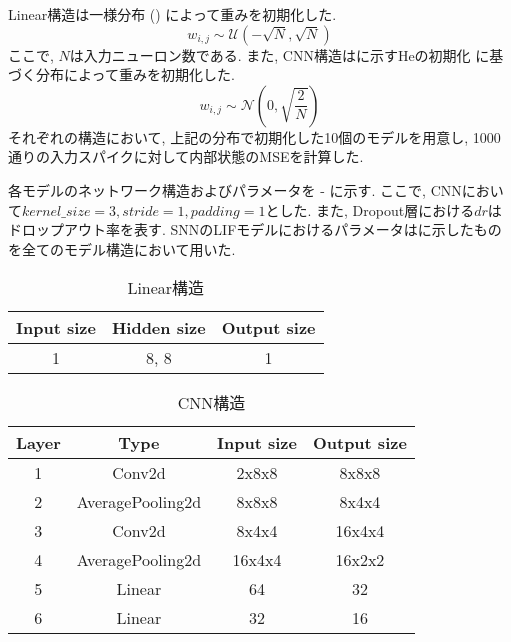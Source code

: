 Linear構造は一様分布 () によって重みを初期化した.
\begin{equation}
    w_{i,j} \sim \mathcal{U}\left(-\sqrt{N}, \sqrt{N}\right) \label{eq:uniform:distribution}
\end{equation}
ここで, $N$は入力ニューロン数である.
また, CNN構造はに示すHeの初期化\cite{heinit} に基づく分布によって重みを初期化した.
\begin{equation}
    w_{i,j} \sim \mathcal{N}\left(0, \sqrt{\frac{2}{N}}\right) \label{eq:he:initialization}
\end{equation}
それぞれの構造において, 上記の分布で初期化した10個のモデルを用意し, 1000通りの入力スパイクに対して内部状態のMSEを計算した.

各モデルのネットワーク構造およびパラメータを - に示す.
ここで, CNNにおいて$kernel\_size=3, stride=1, padding=1$とした.
また, Dropout層における$dr$はドロップアウト率を表す.
SNNのLIFモデルにおけるパラメータはに示したものを全てのモデル構造において用いた.
\begin{table}[htb]
    \centering
    \caption{Linear構造}
    \label{tab:model:parameter:linear}
    \begin{tabular}{ccc}
        \hline
        \textbf{Input size}& \textbf{Hidden size} & \textbf{Output size}\\
        \hline
        1   & 8, 8 & 1 \\
        \hline
    \end{tabular}
\end{table}

\begin{table}[htb]
    \centering
    \caption{CNN構造}
    \label{tab:model:parameter:cnn}
    \begin{tabular}{cccc}
        \hline
        \textbf{Layer}& \textbf{Type}&\textbf{Input size} & \textbf{Output size}\\
        \hline
        1   & Conv2d & 2x8x8 & 8x8x8 \\
        2 & AveragePooling2d & 8x8x8 & 8x4x4 \\
        3 & Conv2d & 8x4x4 & 16x4x4 \\
        4 & AveragePooling2d & 16x4x4 & 16x2x2 \\
        5 & Linear & 64 & 32 \\
        6 & Linear & 32 & 16 \\
        \hline
    \end{tabular}
\end{table}

